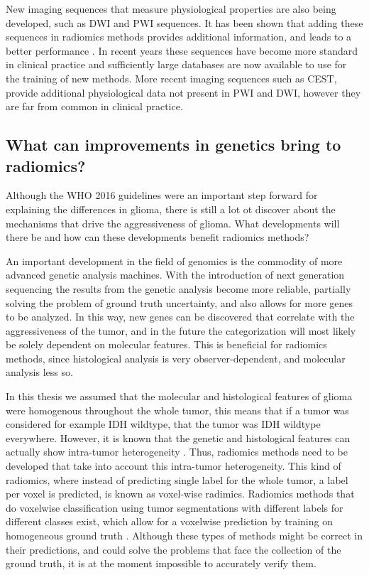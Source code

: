 New imaging sequences that measure physiological properties are also being developed, such as \gls{DWI} and \gls{PWI} sequences.
It has been shown that adding these sequences in radiomics methods provides additional information, and leads to a better performance \autocite{park2020radiomicsdwi,kim2020radiomicsdwi}.
In recent years these sequences have become more standard in clinical practice and sufficiently large databases are now available to use for the training of new methods.
More recent imaging sequences such as \gls{CEST}, provide additional physiological data not present in \gls{PWI} and \gls{DWI}, however they are far from common in clinical practice.



\subsection{What can improvements in genetics bring to radiomics?}\label{sec:discussion_new_genetics}
Although the \gls{WHO} 2016 guidelines were an important step forward for explaining the differences in glioma, there is still a lot ot discover about the mechanisms that drive the aggressiveness of glioma.
What developments will there be and how can these developments benefit radiomics methods?

An important development in the field of genomics is the commodity of more advanced genetic analysis machines.
With the introduction of next generation sequencing the results from the genetic analysis become more reliable, partially solving the problem of ground truth uncertainty, and also allows for more genes to be analyzed.
In this way, new genes can be discovered that correlate with the aggressiveness of the tumor, and in the future the categorization will most likely be solely dependent on molecular features.
This is beneficial for radiomics methods, since histological analysis is very observer-dependent, and molecular analysis less so.

In this thesis we assumed that the molecular and histological features of glioma were homogenous throughout the whole \gls{tumor}, this means that if a \gls{tumor} was considered for example \gls{IDH} wildtype, that the \gls{tumor} was \gls{IDH} wildtype everywhere.
However, it is known that the genetic and histological features can actually show intra-tumor heterogeneity \autocite{eder2014heterogeneity}.
Thus, radiomics methods need to be developed that take into account this intra-tumor heterogeneity.
This kind of radiomics, where instead of predicting single label for the whole \gls{tumor}, a label per voxel is predicted, is known as voxel-wise radimics.
Radiomics methods that do voxelwise classification using \gls{tumor} segmentations with different labels for different classes exist, which allow for a voxelwise prediction by training on homogeneous ground truth \autocite{yogananda20201p19q}.
Although these types of methods might be correct in their predictions, and could solve the problems that face the collection of the ground truth, it is at the moment impossible to accurately verify them.




